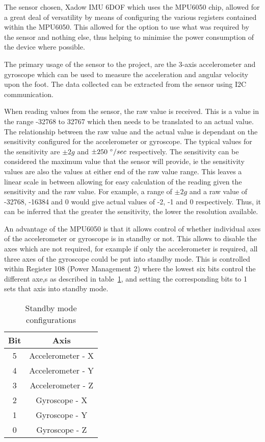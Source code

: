 
The sensor chosen, Xadow IMU 6DOF which uses the MPU6050 chip, allowed for a great deal of versatility by means of configuring the various registers contained within the MPU6050. This allowed for the option to use what was required by the sensor and nothing else, thus helping to minimise the power consumption of the device where possible. \cite{sensor_specs}

The primary usage of the sensor to the project, are the 3-axis accelerometer and gyroscope which can be used to measure the acceleration and angular velocity upon the foot. The data collected can be extracted from the sensor using I2C communication. 

When reading values from the sensor, the raw value is received. This is a value in the range -32768 to 32767 which then needs to be translated to an actual value. The relationship between the raw value and the actual value is dependant on the sensitivity configured for the accelerometer or gyroscope. The typical values for the sensitivity are $\pm 2g$ and $\pm 250~\degree / sec$ respectively. The sensitivity can be considered the maximum value that the sensor will provide, ie the sensitivity values are also the values at either end of the raw value range. This leaves a linear scale in between allowing for easy calculation of the reading given the sensitivity and the raw value. For example, a range of $\pm 2g$ and a raw value of -32768, -16384 and 0 would give actual values of -2, -1 and 0 respectively. Thus, it can be inferred that the greater the sensitivity, the lower the resolution available. \cite{sensor_raw_explanation}

An advantage of the MPU6050 is that it allows control of whether individual axes of the accelerometer or gyroscope is in standby or not. This allows to disable the axes which are not required, for example if only the accelerometer is required, all three axes of the gyroscope could be put into standby mode. This is controlled within Register 108 (Power Management 2) where the lowest six bits control the different axe,s as described in table~\ref{tab:sensor:power}, and setting the corresponding bits to 1 sets that axis into standby mode.

\begin{table}
	\centering
	\begin{tabular}{|c|c|}
		\hline
		Bit & Axis \\
		\hline
		5 & Accelerometer - X \\
		4 & Accelerometer - Y \\
		3 & Accelerometer - Z \\
		2 & Gyroscope - X \\
		1 & Gyroscope - Y \\
		0 & Gyroscope - Z \\
		\hline
	\end{tabular}
	\caption{Standby mode configurations}
	\label{tab:sensor:power}
\end{table}

